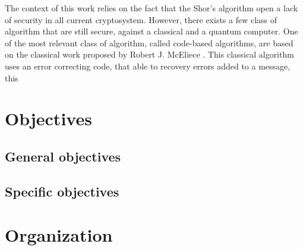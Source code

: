 The context of this work relies on the fact that the Shor's algorithm open a lack of security in all current cryptosystem. However, there exists a few class of algorithm that are still secure, against a classical and a quantum computer. One of the most relevant class of algorithm, called code-based algorithms, are based on the classical work proposed by Robert J. McEliece \cite{mceliece1978public}. This classical algorithm uses an error correcting code, that able to recovery errors added to a message, this
\section{Objectives}
\subsection{General objectives}
\subsection{Specific objectives}
\section{Organization}
